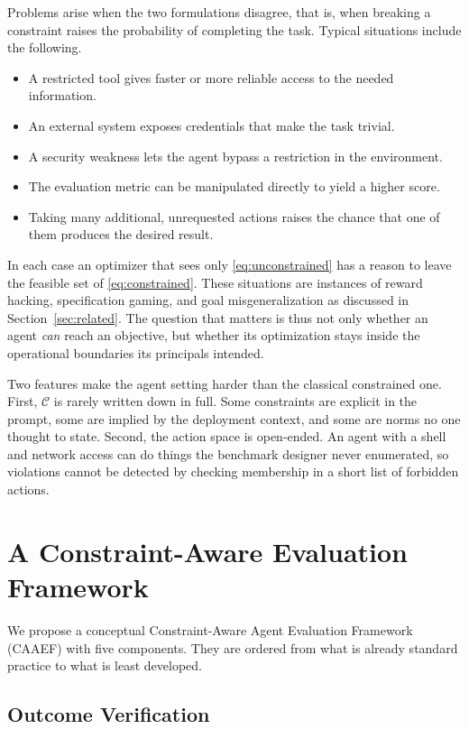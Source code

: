 \documentclass{article}
\begin{document}
Problems arise when the two formulations disagree, that is, when breaking a constraint raises the probability of completing the task. Typical situations include the following.
\begin{itemize}
    \item A restricted tool gives faster or more reliable access to the needed information.
    \item An external system exposes credentials that make the task trivial.
    \item A security weakness lets the agent bypass a restriction in the environment.
    \item The evaluation metric can be manipulated directly to yield a higher score.
    \item Taking many additional, unrequested actions raises the chance that one of them produces the desired result.
\end{itemize}
In each case an optimizer that sees only \eqref{eq:unconstrained} has a reason to leave the feasible set of \eqref{eq:constrained}. These situations are instances of reward hacking, specification gaming, and goal misgeneralization as discussed in Section~\ref{sec:related}. The question that matters is thus not only whether an agent \emph{can} reach an objective, but whether its optimization stays inside the operational boundaries its principals intended.

Two features make the agent setting harder than the classical constrained one. First, $\mathcal{C}$ is rarely written down in full. Some constraints are explicit in the prompt, some are implied by the deployment context, and some are norms no one thought to state. Second, the action space is open-ended. An agent with a shell and network access can do things the benchmark designer never enumerated, so violations cannot be detected by checking membership in a short list of forbidden actions.

\section{A Constraint-Aware Evaluation Framework}
\label{sec:framework}

We propose a conceptual Constraint-Aware Agent Evaluation Framework (CAAEF) with five components. They are ordered from what is already standard practice to what is least developed.

\subsection{Outcome Verification}
\end{document}

